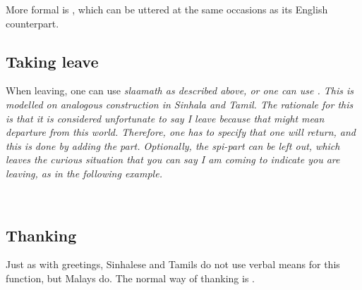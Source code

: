 More formal is , which can be uttered at the same occasions as its English counterpart.

\subsection{Taking leave}\label{sec:pragm:...takeleave}
When leaving, one can use \em slaamath \em as described above, or one can use . This is modelled on analogous construction in Sinhala and Tamil. The rationale for this is that it is considered unfortunate to say \em I leave \em because that might mean departure from this world. Therefore, one has to specify that one will return, and this is done by adding the  part. Optionally, the \em spi-\em part can be left out, which leaves the curious situation that you can say \em I am coming \em to indicate you are leaving, as in the following example.

 \\
\subsection{Thanking}\label{sec:pragm:...thank}
Just as with greetings, Sinhalese and Tamils do not use verbal means for this function, but Malays do. The normal way of thanking is .

 
 \\
% 
% 


